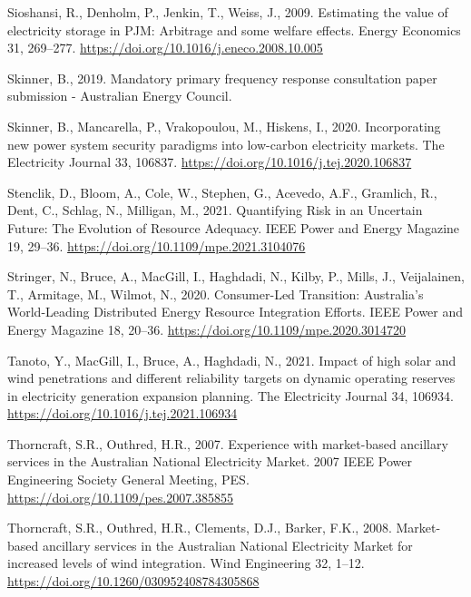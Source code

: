 \documentclass[12pt,a4paper,]{report}
\newlength{\cslhangindent}
\newenvironment{CSLReferences}[2] %
 {%
  \setlength{\parindent}{0pt}
  \ifodd #1 \everypar{\setlength{\hangindent}{\cslhangindent}}\ignorespaces\fi
  \ifnum #2 > 0
  \setlength{\parskip}{#2\baselineskip}
  \fi
 }%
 {}
\begin{document}
\begin{CSLReferences}{1}{0}
\leavevmode{}%
Sioshansi, R., Denholm, P., Jenkin, T., Weiss, J., 2009. Estimating the
value of electricity storage in {PJM}: {Arbitrage} and some welfare
effects. Energy Economics 31, 269--277.
\url{https://doi.org/10.1016/j.eneco.2008.10.005}

\leavevmode{}%
Skinner, B., 2019. Mandatory primary frequency response consultation
paper submission - {Australian Energy Council}.

\leavevmode{}%
Skinner, B., Mancarella, P., Vrakopoulou, M., Hiskens, I., 2020.
Incorporating new power system security paradigms into low-carbon
electricity markets. The Electricity Journal 33, 106837.
\url{https://doi.org/10.1016/j.tej.2020.106837}

\leavevmode{}%
Stenclik, D., Bloom, A., Cole, W., Stephen, G., Acevedo, A.F., Gramlich,
R., Dent, C., Schlag, N., Milligan, M., 2021. Quantifying {Risk} in an
{Uncertain Future}: {The Evolution} of {Resource Adequacy}. IEEE Power
and Energy Magazine 19, 29--36.
\url{https://doi.org/10.1109/mpe.2021.3104076}

\leavevmode{}%
Stringer, N., Bruce, A., MacGill, I., Haghdadi, N., Kilby, P., Mills,
J., Veijalainen, T., Armitage, M., Wilmot, N., 2020. Consumer-{Led
Transition}: {Australia}'s {World-Leading Distributed Energy Resource
Integration Efforts}. IEEE Power and Energy Magazine 18, 20--36.
\url{https://doi.org/10.1109/mpe.2020.3014720}

\leavevmode{}%
Tanoto, Y., MacGill, I., Bruce, A., Haghdadi, N., 2021. Impact of high
solar and wind penetrations and different reliability targets on dynamic
operating reserves in electricity generation expansion planning. The
Electricity Journal 34, 106934.
\url{https://doi.org/10.1016/j.tej.2021.106934}

\leavevmode{}%
Thorncraft, S.R., Outhred, H.R., 2007. Experience with market-based
ancillary services in the {Australian National Electricity Market}. 2007
IEEE Power Engineering Society General Meeting, PES.
\url{https://doi.org/10.1109/pes.2007.385855}

\leavevmode{}%
Thorncraft, S.R., Outhred, H.R., Clements, D.J., Barker, F.K., 2008.
Market-based ancillary services in the {Australian National Electricity
Market} for increased levels of wind integration. Wind Engineering 32,
1--12. \url{https://doi.org/10.1260/030952408784305868}


\end{CSLReferences}
\end{document}
